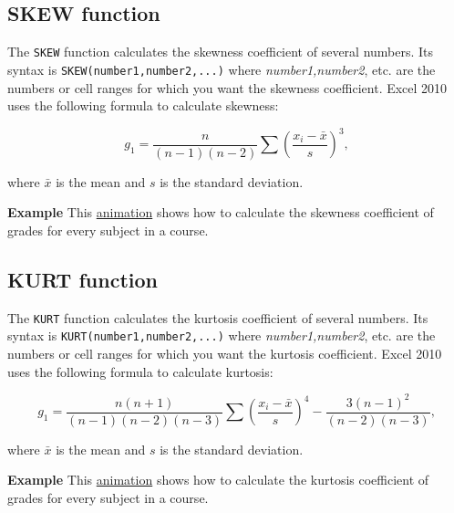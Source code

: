 \subsection{SKEW function}\hypertarget{skew-function}{}\label{skew-function}

The \texttt{SKEW} function calculates the skewness coefficient of several numbers. Its syntax is \texttt{SKEW(number1,number2,...)} where \emph{number1,number2}, etc. are the numbers or cell ranges for which you want the skewness coefficient. Excel 2010 uses the following formula to calculate skewness:

\begin{displaymath}
g_1=\frac{n}{(n-1)(n-2)}\sum \left(\frac{x_i-\bar x}{s}\right)^3,
\end{displaymath}

where $\bar x$ is the mean and $s$ is the standard deviation.

\textbf{Example} This \href{http://aprendeconalf.es/office/excel/manual/img/example_function_skew.gif}{animation} shows how to calculate the skewness coefficient of grades for every subject in a course.

\subsection{KURT function}\hypertarget{kurt-function}{}\label{kurt-function}

The \texttt{KURT} function calculates the kurtosis coefficient of several numbers. Its syntax is \texttt{KURT(number1,number2,...)} where \emph{number1,number2}, etc. are the numbers or cell ranges for which you want the kurtosis coefficient. Excel 2010 uses the following formula to calculate kurtosis:

\begin{displaymath}
g_1=\frac{n(n+1)}{(n-1)(n-2)(n-3)}\sum \left(\frac{x_i-\bar x}{s}\right)^4 - \frac{3(n-1)^2}{(n-2)(n-3)},
\end{displaymath}

where $\bar x$ is the mean and $s$ is the standard deviation.

\textbf{Example} This \href{http://aprendeconalf.es/office/excel/manual/img/example_function_kurt.gif}{animation} shows how to calculate the kurtosis coefficient of grades for every subject in a course.

